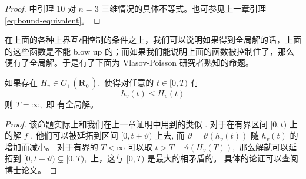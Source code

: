 \begin{proof}
   \cite*{pfaffelmoser_global_1992} 中引理 10 对 $n=3$ 三维情况的具体不等式。也可参见上一章引理 \ref{eq:bound-equivalent}。
\end{proof}



在上面的各种上界互相控制的条件之上，我们可以说明如果得到全局解的话，上面的这些函数是不能 blow up 的；而如果我们能说明上面的函数被控制住了，那么便有了全局解。于是有了下面为 Vlasov-Poisson 研究者熟知的命题。

\begin{proposition}
  \label{prop:vp-existence-criterion}
  如果存在 $H_{v} \in C_{+}\left(\mathbf{R}_{0}^{+}\right),$ 使得对任意的 $t \in[0, T)$ 有
\[
h_{v}(t) \leqslant H_{v}(t)
\]
则 $T=\infty,$ 即 \eqvp 有全局解。
\end{proposition}


\begin{proof}
  该命题实际上和我们在上一章证明中用到的类似  \cite*{HorstClasssicalI}. 对于在有界区间 $[0, t)$ 上的解 $f$ , 他们可以被延拓到区间 $[0, t+\vartheta)$ 上去,  而 $\vartheta=\vartheta(h_{v}(t))$ 随 $h_{v}(t)$ 的增加而减小。 对于有界的 $T<\infty$ 可以取 $t>T-\vartheta\left(H_{v}(T)\right),$ 那么解就可以延拓到 $[0, t+\vartheta)\subsetneq[0, T),$ 上，这与 $[0, T)$ 是最大的相矛盾的。 具体的论证可以查阅 \cite{Pfaffelmoser1989} 博士论文。

\end{proof}


